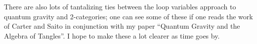 There are also lots of tantalizing ties between the loop variables approach
to quantum gravity and 2-categories; one can see some of these if one
reads the work of Carter and Saito in conjunction with my paper ``Quantum
Gravity and the Algebra of Tangles''.  I hope to make these a lot clearer
as time goes by.
